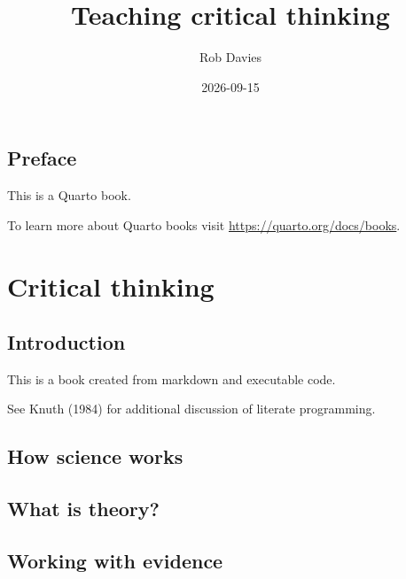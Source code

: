 \documentclass[
  letterpaper,
  DIV=11,
  numbers=noendperiod]{scrreprt}
\title{Teaching critical thinking}
\author{Rob Davies}
\date{2026-09-15}
\renewcommand*\contentsname{Table of contents}
\newcommand\contentsname{Table of contents}
\begin{document}
\maketitle

\renewcommand*\contentsname{Table of contents}
{
\setcounter{tocdepth}{2}
\tableofcontents
}


\chapter*{Preface}\label{preface}


This is a Quarto book.

To learn more about Quarto books visit
\url{https://quarto.org/docs/books}.

\part{Critical thinking}


\chapter{Introduction}\label{introduction}

This is a book created from markdown and executable code.

See Knuth (1984) for additional discussion of literate programming.


\chapter{How science works}\label{how-science-works}


\chapter{What is theory?}\label{what-is-theory}


\chapter{Working with evidence}\label{working-with-evidence}
\end{document}
